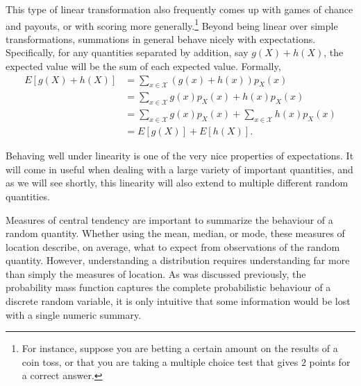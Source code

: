 \documentclass[
  letterpaper,
  DIV=11,
  numbers=noendperiod]{scrreprt}
\theoremstyle{definition}
\theoremstyle{definition}
\theoremstyle{definition}
\theoremstyle{remark}
\begin{document}
This type of linear transformation also frequently comes up with games
of chance and payouts, or with scoring more generally.\footnote{For
  instance, suppose you are betting a certain amount on the results of a
  coin toss, or that you are taking a multiple choice test that gives
  \(2\) points for a correct answer.} Beyond being linear over simple
transformations, summations in general behave nicely with expectations.
Specifically, for any quantities separated by addition, say
\(g(X) + h(X)\), the expected value will be the sum of each expected
value. Formally, \begin{align*}
E[g(X) + h(X)] &= \sum_{x\in\mathcal{X}} (g(x) + h(x))p_X(x) \\
&= \sum_{x\in\mathcal{X}} g(x)p_X(x) + h(x)p_X(x) \\
&= \sum_{x\in\mathcal{X}} g(x)p_X(x) + \sum_{x\in\mathcal{X}} h(x)p_X(x) \\
&= E[g(X)] + E[h(X)].
\end{align*}

Behaving well under linearity is one of the very nice properties of
expectations. It will come in useful when dealing with a large variety
of important quantities, and as we will see shortly, this linearity will
also extend to multiple different random quantities.

Measures of central tendency are important to summarize the behaviour of
a random quantity. Whether using the mean, median, or mode, these
measures of location describe, on average, what to expect from
observations of the random quantity. However, understanding a
distribution requires understanding far more than simply the measures of
location. As was discussed previously, the probability mass function
captures the complete probabilistic behaviour of a discrete random
variable, it is only intuitive that some information would be lost with
a single numeric summary.
\end{document}
